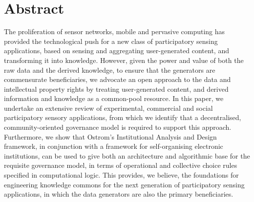 \begingroup
\let\clearpage\relax
\let\cleardoublepage\relax
\let\cleardoublepage\relax

\chapter*{Abstract}
The proliferation of sensor networks, mobile and pervasive computing has provided the technological push
for a new class of participatory sensing applications, based on sensing and aggregating user-generated
content, and transforming it into knowledge. However, given the power and value of both the raw data
and the derived knowledge, to ensure that the generators are commensurate beneficiaries, we advocate an
open approach to the data and intellectual property rights by treating user-generated content, and derived
information and knowledge as a common-pool resource. In this paper, we undertake an extensive review
of experimental, commercial and social participatory sensory applications, from which we identify that a
decentralised, community-oriented governance model is required to support this approach. Furthermore,
we show that Ostrom's Institutional Analysis and Design framework, in conjunction with a framework
for self-organising electronic institutions, can be used to give both an architecture and algorithmic base
for the requisite governance model, in terms of operational and collective choice rules specified in
computational logic. This provides, we believe, the foundations for engineering knowledge commons
for the next generation of participatory sensing applications, in which the data generators are also the
primary beneficiaries.


\endgroup			

\vfill
